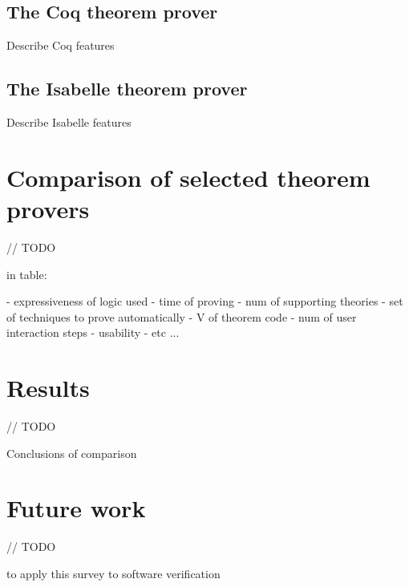 \documentclass[article]{aaltoseries}
\begin{document}
\subsection{The Coq theorem prover}
\label{sec:prover_coq}

Describe Coq features


\subsection{The Isabelle theorem prover}
\label{sec:prover_isabelle}

Describe Isabelle features



\section{Comparison of selected theorem provers}
\label{sec:comparison}
// TODO

in table:

- expressiveness of logic used
- time of proving
- num of supporting theories
- set of techniques to prove automatically
- V of theorem code
- num of user interaction steps
- usability
- etc ...



\section{Results}
\label{sec:results}
// TODO

Conclusions of comparison


\section{Future work}
\label{sec:future_work}
// TODO

to apply this survey to software verification






\end{document}
